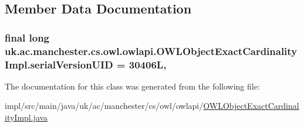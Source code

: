 \subsection{Member Data Documentation}
\hypertarget{classuk_1_1ac_1_1manchester_1_1cs_1_1owl_1_1owlapi_1_1_o_w_l_object_exact_cardinality_impl_a70afbaab703212bb9b568c293a4476c7}{
\subsubsection[{serial\-Version\-U\-I\-D}]{\setlength{\rightskip}{0pt plus 5cm}final long uk.\-ac.\-manchester.\-cs.\-owl.\-owlapi.\-O\-W\-L\-Object\-Exact\-Cardinality\-Impl.\-serial\-Version\-U\-I\-D = 30406\-L\hspace{0.3cm}{\ttfamily [static]}, {\ttfamily [private]}}}\label{classuk_1_1ac_1_1manchester_1_1cs_1_1owl_1_1owlapi_1_1_o_w_l_object_exact_cardinality_impl_a70afbaab703212bb9b568c293a4476c7}


The documentation for this class was generated from the following file\-:\begin{DoxyCompactItemize}
\item 
impl/src/main/java/uk/ac/manchester/cs/owl/owlapi/\hyperlink{_o_w_l_object_exact_cardinality_impl_8java}{O\-W\-L\-Object\-Exact\-Cardinality\-Impl.\-java}\end{DoxyCompactItemize}

